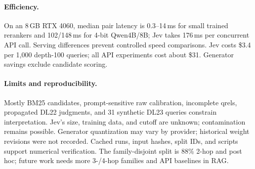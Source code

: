 \documentclass[sigconf,nonacm]{acmart}
\begin{document}
\paragraph{Efficiency.}
On an 8\,GB RTX 4060, median pair latency is 0.3--14\,ms for small trained rerankers and 102/148\,ms for 4-bit Qwen4B/8B; Jev takes 176\,ms per concurrent API call. Serving differences prevent controlled speed comparisons. Jev costs \$3.4 per 1,000 depth-100 queries; all API experiments cost about \$31. Generator savings exclude candidate scoring.

\paragraph{Limits and reproducibility.}
Mostly BM25 candidates, prompt-sensitive raw calibration, incomplete qrels, propagated DL22 judgments, and 31 synthetic DL23 queries constrain interpretation. Jev's size, training data, and cutoff are unknown; contamination remains possible. Generator quantization may vary by provider; historical weight revisions were not recorded. Cached runs, input hashes, split IDs, and scripts support numerical verification. The family-disjoint split is 88\% 2-hop and post hoc; future work needs more 3-/4-hop families and API baselines in RAG.

\clearpage


\end{document}
